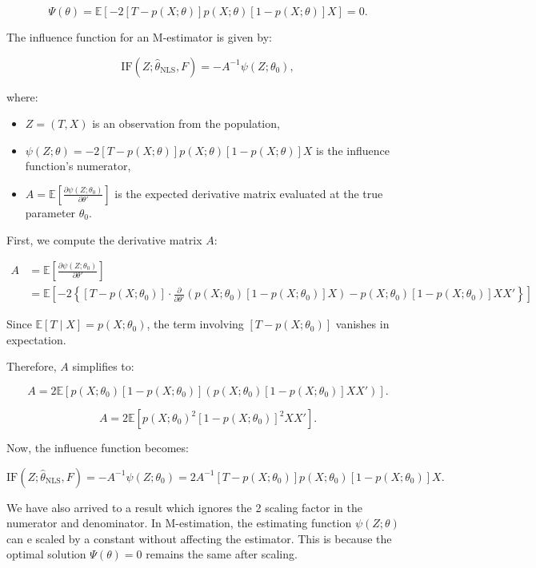 \documentclass{article}
\begin{document}
\[
\Psi(\theta) = \mathbb{E} \left[ -2 \left[ T - p(X; \theta) \right] p(X; \theta) [1 - p(X; \theta)] X \right] = 0.
\]

The influence function for an M-estimator is given by:

\[
\text{IF}(Z; \hat{\theta}_{\text{NLS}}, F) = -A^{-1} \psi(Z; \theta_0),
\]

where:

\begin{itemize}
    \item \( Z = (T, X) \) is an observation from the population,
    \item \( \psi(Z; \theta) = -2 \left[ T - p(X; \theta) \right] p(X; \theta) [1 - p(X; \theta)] X \) is the influence function's numerator,
    \item \( A = \mathbb{E} \left[ \frac{\partial \psi(Z; \theta_0)}{\partial \theta'} \right] \) is the expected derivative matrix evaluated at the true parameter \( \theta_0 \).
\end{itemize}

First, we compute the derivative matrix \( A \):

\begin{align*}
  A
  &= \mathbb{E} \left[ \frac{\partial \psi(Z; \theta_0)}{\partial \theta'} \right] \\
  &= \mathbb{E} \left[ -2 \left\{ [T - p(X; \theta_0)] \cdot \frac{\partial}{\partial \theta'} \left( p(X; \theta_0) [1 - p(X; \theta_0)] X \right) - p(X; \theta_0) [1 - p(X; \theta_0)] X X' \right\} \right]
\end{align*}

Since \( \mathbb{E}[T \mid X] = p(X; \theta_0) \), the term involving \( [T - p(X; \theta_0)] \) vanishes in expectation. 

Therefore, \( A \) simplifies to:

\[
A = 2 \mathbb{E} \left[ p(X; \theta_0) [1 - p(X; \theta_0)] \left( p(X; \theta_0) [1 - p(X; \theta_0)] X X' \right) \right].
\]

\[
A = 2 \mathbb{E} \left[ p(X; \theta_0)^2 [1 - p(X; \theta_0)]^2 X X' \right].
\]

Now, the influence function becomes:

\[
\text{IF}(Z; \hat{\theta}_{\text{NLS}}, F) = -A^{-1} \psi(Z; \theta_0) = 2 A^{-1} [T - p(X; \theta_0)] p(X; \theta_0) [1 - p(X; \theta_0)] X.
\]

We have also arrived to a result which ignores the 2 scaling factor in the numerator and denominator. In M-estimation, the estimating function $\psi(Z; \theta)$ can e scaled by a constant without affecting the estimator. This is because the optimal solution $\Psi(\theta) = 0$ remains the same after scaling.
\end{document}
